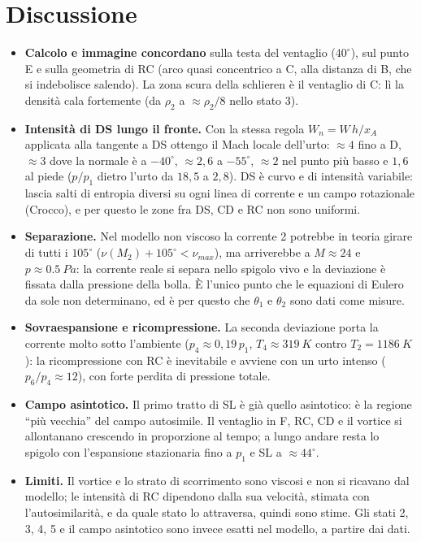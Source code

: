 \section*{Discussione}
\begin{itemize}
\item \textbf{Calcolo e immagine concordano} sulla testa del ventaglio ($40^\circ$), sul punto E e sulla geometria di
  RC (arco quasi concentrico a C, alla distanza di B, che si indebolisce salendo). La zona scura della schlieren è il
  ventaglio di C: lì la densità cala fortemente (da $\rho_2$ a $\approx\rho_2/8$ nello stato 3).
\item \textbf{Intensità di DS lungo il fronte.} Con la stessa regola $W_n=W\,h/x_A$ applicata alla tangente a DS
  ottengo il Mach locale dell'urto: $\approx4$ fino a D, $\approx3$ dove la normale è a $-40^\circ$, $\approx2{,}6$ a
  $-55^\circ$, $\approx2$ nel punto più basso e $1{,}6$ al piede ($p/p_1$ dietro l'urto da $18{,}5$ a $2{,}8$). DS è
  curvo e di intensità variabile: lascia salti di entropia diversi su ogni linea di corrente e un campo rotazionale
  (Crocco), e per questo le zone fra DS, CD e RC non sono uniformi.
\item \textbf{Separazione.} Nel modello non viscoso la corrente 2 potrebbe in teoria girare di tutti i $105^\circ$
  ($\nu(M_2)+105^\circ<\nu_{max}$), ma arriverebbe a $M\approx24$ e $p\approx\SI{0.5}{Pa}$: la corrente reale si separa
  nello spigolo vivo e la deviazione è fissata dalla pressione della bolla. È l'unico punto che le equazioni di Eulero
  da sole non determinano, ed è per questo che $\theta_1$ e $\theta_2$ sono dati come misure.
\item \textbf{Sovraespansione e ricompressione.} La seconda deviazione porta la corrente molto sotto l'ambiente
  ($p_4\approx0{,}19\,p_1$, $T_4\approx\SI{319}{K}$ contro $T_2=\SI{1186}{K}$): la ricompressione con RC è
  inevitabile e avviene con un urto intenso ($p_6/p_4\approx12$), con forte perdita di pressione totale.
\item \textbf{Campo asintotico.} Il primo tratto di SL è già quello asintotico: è la regione ``più vecchia'' del campo
  autosimile. Il ventaglio in F, RC, CD e il vortice si allontanano crescendo in proporzione al tempo; a lungo andare
  resta lo spigolo con l'espansione stazionaria fino a $p_1$ e SL a $\approx44^\circ$.
\item \textbf{Limiti.} Il vortice e lo strato di scorrimento sono viscosi e non si ricavano dal modello; le intensità
  di RC dipendono dalla sua velocità, stimata con l'autosimilarità, e da quale stato lo attraversa, quindi sono stime.
  Gli stati 2, 3, 4, 5 e il campo asintotico sono invece esatti nel modello, a partire dai dati.
\end{itemize}


